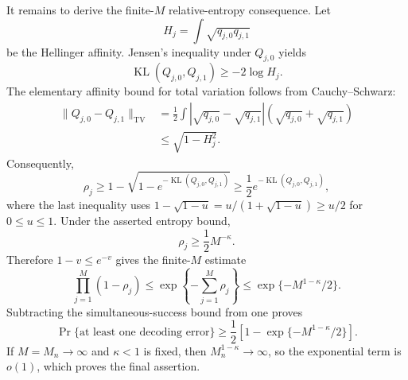 It remains to derive the finite-\(M\) relative-entropy consequence.  Let
\[
 H_j=\int\sqrt{q_{j,0}q_{j,1}}
\]
be the Hellinger affinity.  Jensen's inequality under \(Q_{j,0}\) yields
\[
 \operatorname{KL}(Q_{j,0},Q_{j,1})\geq-2\log H_j.
\]
The elementary affinity bound for total variation follows from Cauchy--Schwarz:
\[
\begin{aligned}
 \lVert Q_{j,0}-Q_{j,1}\rVert_{\mathrm{TV}}
 &=\frac12\int|\sqrt{q_{j,0}}-\sqrt{q_{j,1}}|
             (\sqrt{q_{j,0}}+\sqrt{q_{j,1}})\\
 &\leq\sqrt{1-H_j^2}.
\end{aligned}
\]
Consequently,
\[
 \rho_j
 \geq1-\sqrt{1-e^{-\operatorname{KL}(Q_{j,0},Q_{j,1})}}
 \geq\frac12e^{-\operatorname{KL}(Q_{j,0},Q_{j,1})},
\]
where the last inequality uses \(1-\sqrt{1-u}=u/(1+\sqrt{1-u})\geq u/2\) for \(0\leq u\leq1\).  Under the asserted entropy bound,
\[
 \rho_j\geq\frac12M^{-\kappa}.
\]
Therefore \(1-v\leq e^{-v}\) gives the finite-\(M\) estimate
\[
 \prod_{j=1}^M(1-\rho_j)
 \leq\exp\!\left\{-\sum_{j=1}^M\rho_j\right\}
 \leq\exp\{-M^{1-\kappa}/2\}.
\]
Subtracting the simultaneous-success bound from one proves
\[
 \Pr\{\text{at least one decoding error}\}
 \geq\frac12\left[1-\exp\{-M^{1-\kappa}/2\}\right].
\]
If \(M=M_n\to\infty\) and \(\kappa<1\) is fixed, then \(M_n^{1-\kappa}\to\infty\), so the exponential term is \(o(1)\), which proves the final assertion.